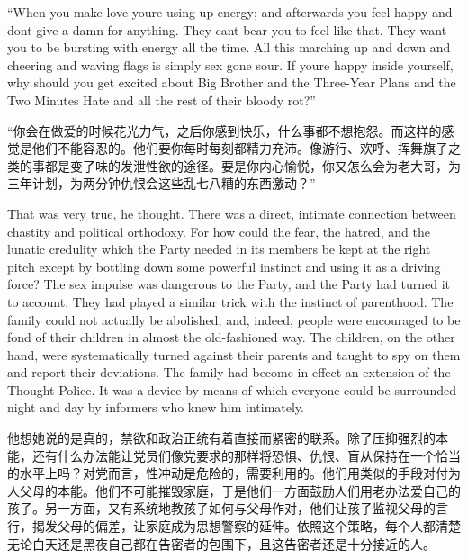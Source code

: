 \begin{paracol}{2}
``When you make love you\textquotesingle re using up energy; and
afterwards you feel happy and don\textquotesingle t give a damn for
anything. They can\textquotesingle t bear you to feel like that. They
want you to be bursting with energy all the time. All this marching up
and down and cheering and waving flags is simply sex gone sour. If
you\textquotesingle re happy inside yourself, why should you get excited
about Big Brother and the Three-Year Plans and the Two Minutes Hate and
all the rest of their bloody rot?''

\switchcolumn

``你会在做爱的时候花光力气，之后你感到快乐，什么事都不想抱怨。而这样的感觉是他们不能容忍的。他们要你每时每刻都精力充沛。像游行、欢呼、挥舞旗子之类的事都是变了味的发泄性欲的途径。要是你内心愉悦，你又怎么会为老大哥，为三年计划，为两分钟仇恨会这些乱七八糟的东西激动？''

\switchcolumn*

That was very true, he thought. There was a direct, intimate connection
between chastity and political orthodoxy. For how could the fear, the
hatred, and the lunatic credulity which the Party needed in its members
be kept at the right pitch except by bottling down some powerful
instinct and using it as a driving force? The sex impulse was dangerous
to the Party, and the Party had turned it to account. They had played a
similar trick with the instinct of parenthood. The family could not
actually be abolished, and, indeed, people were encouraged to be fond of
their children in almost the old-fashioned way. The children, on the
other hand, were systematically turned against their parents and taught
to spy on them and report their deviations. The family had become in
effect an extension of the Thought Police. It was a device by means of
which everyone could be surrounded night and day by informers who knew
him intimately.

\switchcolumn

他想她说的是真的，禁欲和政治正统有着直接而紧密的联系。除了压抑强烈的本能，还有什么办法能让党员们像党要求的那样将恐惧、仇恨、盲从保持在一个恰当的水平上吗？对党而言，性冲动是危险的，需要利用的。他们用类似的手段对付为人父母的本能。他们不可能摧毁家庭，于是他们一方面鼓励人们用老办法爱自己的孩子。另一方面，又有系统地教孩子如何与父母作对，他们让孩子监视父母的言行，揭发父母的偏差，让家庭成为思想警察的延伸。依照这个策略，每个人都清楚无论白天还是黑夜自己都在告密者的包围下，且这告密者还是十分接近的人。

\switchcolumn*


\end{paracol}
